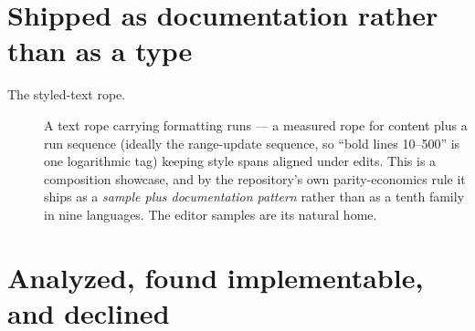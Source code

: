 \documentclass[11pt,twoside,openright]{book}
\begin{document}
\section{Shipped as documentation rather than as a type}

\begin{description}
\item[The styled-text rope.] A text rope carrying formatting runs --- a measured
rope for content plus a run sequence (ideally the range-update sequence, so
``bold lines 10--500'' is one logarithmic tag) keeping style spans aligned under
edits. This is a composition showcase, and by the repository's own
parity-economics rule it ships as a \emph{sample plus documentation pattern}
rather than as a tenth family in nine languages. The editor samples are its
natural home.
\end{description}


\section{Analyzed, found implementable, and declined}
\end{document}
